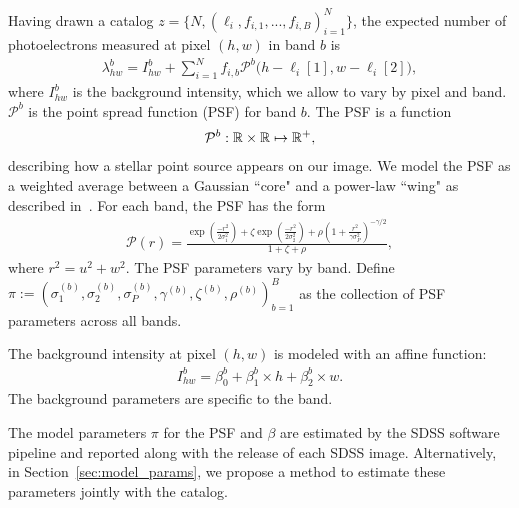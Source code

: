 Having drawn a catalog $z = \{N, (\ell_i, f_{i,1}, ..., f_{i,B})_{i = 1}^N\}$,
the expected number of photoelectrons measured at pixel $(h,w)$ in band $b$ is
\begin{align}
  \lambda^b_{hw} = I^{b}_{hw} + \sum_{i = 1}^N f_{i,b} \mathcal{P}^b\big(h - \ell_{i}[1], w - \ell_{i}[2]\big),
  \label{eq:expected_intensity}
\end{align}
where $I^{b}_{hw}$ is the background intensity, which we allow to vary by pixel and band. $\mathcal{P}^b$ is the point spread function (PSF) for band $b$. The PSF
is a function 
\begin{align}
\mathcal{P}^b : \mathbb{R} \times \mathbb{R} \mapsto \mathbb{R}^+,
\end{align}
describing how a stellar point source appears
on our image. We model the PSF as a weighted average between a Gaussian ``core" and a power-law ``wing" as described in~\cite{Xin2018psf}. For each band, the PSF has the form
\begin{align}
    \mathcal{P}(r) = \frac{\exp(\frac{-r^2}{2\sigma_1^2}) + 
                            \zeta \exp(\frac{-r^2}{2\sigma_2^2}) + 
                            \rho(1 + \frac{r^2}{\gamma\sigma^2_P})^{-\gamma/2} }{1 + \zeta + \rho},
\end{align}
where $r^2 = u^2 + w^2$. The PSF parameters vary by band. Define 
$\pi := (\sigma_{1}^{(b)}, \sigma_{2}^{(b)}, \sigma_{P}^{(b)}, \gamma^{(b)}, \zeta^{(b)}, \rho^{(b)})_{b=1}^B$ as the collection of PSF parameters across all bands. 

The background intensity at pixel $(h,w)$ is modeled with an affine function: 
\begin{align}
    I_{hw}^{b} = \beta_0^{b} + \beta_1^{b} \times h + \beta_2^{b} \times w.
\end{align}
The background parameters are specific to the band. 

The model parameters $\pi$ for the PSF and $\beta$ are estimated by the SDSS software pipeline and reported along with the release of each SDSS image. Alternatively, in Section~\ref{sec:model_params}, we propose a method to estimate these parameters jointly with the catalog. 


